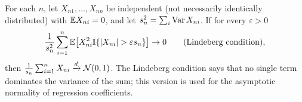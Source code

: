 \documentclass[main.tex]{subfiles}
\begin{document}
\begin{theorem}\label{thm:lindeberg}
For each $n$, let $X_{n1},\dots,X_{nn}$ be independent (not necessarily identically distributed) with $\mathbb{E} X_{ni}=0$, and let $s_n^2=\sum_i\operatorname{Var} X_{ni}$. If for every $\varepsilon>0$
\[
\frac1{s_n^2}\sum_{i=1}^n\E\big[X_{ni}^2\I\{|X_{ni}|>\varepsilon s_n\}\big]\to0\qquad\text{(Lindeberg condition)},
\]
then $\frac{1}{s_n}\sum_{i=1}^n X_{ni}\xrightarrow{d}\mathcal{N}(0,1)$. The Lindeberg condition says that no single term dominates the variance of the sum; this version is used for the asymptotic normality of regression coefficients.
\end{theorem}
\end{document}
